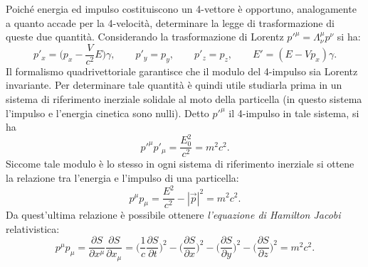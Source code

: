Poiché energia ed impulso costituiscono un 4-vettore è opportuno, analogamente a quanto accade per la 4-velocità, determinare la legge di trasformazione di queste due quantità. Considerando la trasformazione di Lorentz $p'^\mu=\Lambda_\nu^\mu p^\nu$ si ha:
\begin{equation}
    p'_x=\bigg(p_x-\frac{V}{c^2}E\bigg)\gamma,\qquad p'_y=p_y,\qquad p'_z=p_z,\qquad E'=(E-Vp_x)\gamma.
    \label{TrasfLorentzEI}
\end{equation}
Il formalismo quadrivettoriale garantisce che il modulo del 4-impulso sia Lorentz invariante. Per determinare tale quantità è quindi utile studiarla prima in un sistema di riferimento inerziale solidale al moto della particella (in questo sistema l'impulso e l'energia cinetica sono nulli). Detto $p'^\mu$ il 4-impulso in tale sistema, si ha
\begin{equation*}
    p'^\mu p'_\mu=\frac{E_0^2}{c^2}=m^2c^2.
\end{equation*}  
Siccome tale modulo è lo stesso in ogni sistema di riferimento inerziale si ottene la relazione tra l'energia e l'impulso di una particella:
\begin{equation}
    p^\mu p_\mu=\frac{E^2}{c^2}-|\vec p |^2=m^2c^2.
    \label{relazioneEnergiaImpulso}
\end{equation}
Da quest'ultima relazione è possibile ottenere \emph{l'equazione di Hamilton Jacobi} relativistica:
\begin{equation}
    p^\mu p_\mu=\frac{\partial S }{\partial x^\mu}\frac{\partial S }{\partial x_\mu}=\bigg(\frac{1}{c}\frac{\partial S }{\partial t}\bigg)^2-\bigg(\frac{\partial S }{\partial x}\bigg)^2-\bigg(\frac{\partial S }{\partial y}\bigg)^2-\bigg(\frac{\partial S }{\partial z}\bigg)^2=m^2c^2.
\end{equation}
